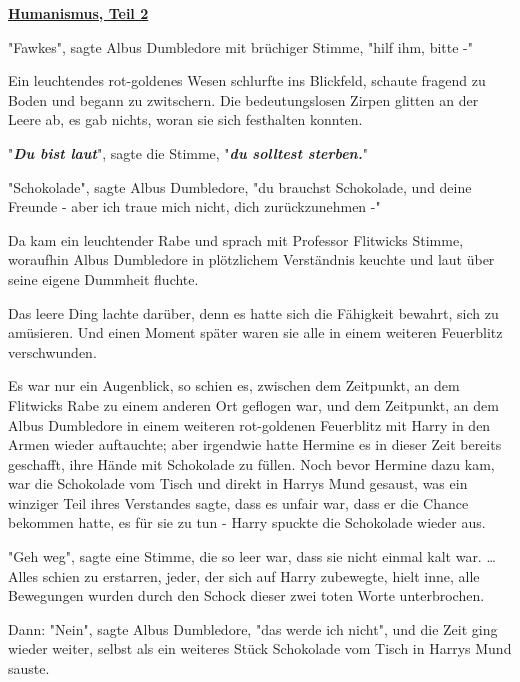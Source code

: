 

\hypertarget{humanismus-teil-2}{%

\textbf{\uline{Humanismus, Teil 2}}

"Fawkes", sagte Albus Dumbledore mit brüchiger Stimme, "hilf ihm, bitte -"

Ein leuchtendes rot-goldenes Wesen schlurfte ins Blickfeld, schaute fragend zu Boden und begann zu zwitschern. Die bedeutungslosen Zirpen glitten an der Leere ab, es gab nichts, woran sie sich festhalten konnten.

"\textbf{\emph{Du bist laut}}", sagte die Stimme, "\textbf{\emph{du solltest sterben.}}"

"Schokolade", sagte Albus Dumbledore, "du brauchst Schokolade, und deine Freunde - aber ich traue mich nicht, dich zurückzunehmen -"

Da kam ein leuchtender Rabe und sprach mit Professor Flitwicks Stimme, woraufhin Albus Dumbledore in plötzlichem Verständnis keuchte und laut über seine eigene Dummheit fluchte.

Das leere Ding lachte darüber, denn es hatte sich die Fähigkeit bewahrt, sich zu amüsieren. Und einen Moment später waren sie alle in einem weiteren Feuerblitz verschwunden.

Es war nur ein Augenblick, so schien es, zwischen dem Zeitpunkt, an dem Flitwicks Rabe zu einem anderen Ort geflogen war, und dem Zeitpunkt, an dem Albus Dumbledore in einem weiteren rot-goldenen Feuerblitz mit Harry in den Armen wieder auftauchte; aber irgendwie hatte Hermine es in dieser Zeit bereits geschafft, ihre Hände mit Schokolade zu füllen. Noch bevor Hermine dazu kam, war die Schokolade vom Tisch und direkt in Harrys Mund gesaust, was ein winziger Teil ihres Verstandes sagte, dass es unfair war, dass er die Chance bekommen hatte, es für sie zu tun - Harry spuckte die Schokolade wieder aus.

"Geh weg", sagte eine Stimme, die so leer war, dass sie nicht einmal kalt war. … Alles schien zu erstarren, jeder, der sich auf Harry zubewegte, hielt inne, alle Bewegungen wurden durch den Schock dieser zwei toten Worte unterbrochen.

Dann: "Nein", sagte Albus Dumbledore, "das werde ich nicht", und die Zeit ging wieder weiter, selbst als ein weiteres Stück Schokolade vom Tisch in Harrys Mund sauste.

}
